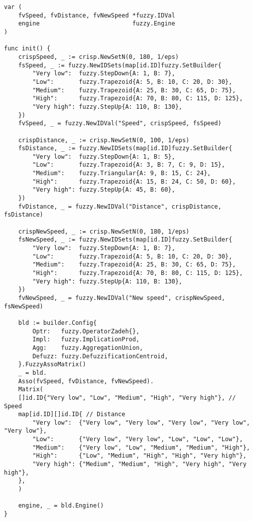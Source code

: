 \begin{lstlisting}[label=lst:inference,caption=Инициализация нечётких переменных и правил логического вывода]
var (
	fvSpeed, fvDistance, fvNewSpeed *fuzzy.IDVal
	engine                          fuzzy.Engine
)

func init() {
	crispSpeed, _ := crisp.NewSetN(0, 180, 1/eps)
	fsSpeed, _ := fuzzy.NewIDSets(map[id.ID]fuzzy.SetBuilder{
		"Very low":  fuzzy.StepDown{A: 1, B: 7},
		"Low":       fuzzy.Trapezoid{A: 5, B: 10, C: 20, D: 30},
		"Medium":    fuzzy.Trapezoid{A: 25, B: 30, C: 65, D: 75},
		"High":      fuzzy.Trapezoid{A: 70, B: 80, C: 115, D: 125},
		"Very high": fuzzy.StepUp{A: 110, B: 130},
	})
	fvSpeed, _ = fuzzy.NewIDVal("Speed", crispSpeed, fsSpeed)
	
	crispDistance, _ := crisp.NewSetN(0, 100, 1/eps)
	fsDistance, _ := fuzzy.NewIDSets(map[id.ID]fuzzy.SetBuilder{
		"Very low":  fuzzy.StepDown{A: 1, B: 5},
		"Low":       fuzzy.Trapezoid{A: 3, B: 7, C: 9, D: 15},
		"Medium":    fuzzy.Triangular{A: 9, B: 15, C: 24},
		"High":      fuzzy.Trapezoid{A: 15, B: 24, C: 50, D: 60},
		"Very high": fuzzy.StepUp{A: 45, B: 60},
	})
	fvDistance, _ = fuzzy.NewIDVal("Distance", crispDistance, fsDistance)
	
	crispNewSpeed, _ := crisp.NewSetN(0, 180, 1/eps)
	fsNewSpeed, _ := fuzzy.NewIDSets(map[id.ID]fuzzy.SetBuilder{
		"Very low":  fuzzy.StepDown{A: 1, B: 7},
		"Low":       fuzzy.Trapezoid{A: 5, B: 10, C: 20, D: 30},
		"Medium":    fuzzy.Trapezoid{A: 25, B: 30, C: 65, D: 75},
		"High":      fuzzy.Trapezoid{A: 70, B: 80, C: 115, D: 125},
		"Very high": fuzzy.StepUp{A: 110, B: 130},
	})
	fvNewSpeed, _ = fuzzy.NewIDVal("New speed", crispNewSpeed, fsNewSpeed)
	
	bld := builder.Config{
		Optr:   fuzzy.OperatorZadeh{},
		Impl:   fuzzy.ImplicationProd,
		Agg:    fuzzy.AggregationUnion,
		Defuzz: fuzzy.DefuzzificationCentroid,
	}.FuzzyAssoMatrix()
	_ = bld.
	Asso(fvSpeed, fvDistance, fvNewSpeed).
	Matrix(
	[]id.ID{"Very low", "Low", "Medium", "High", "Very high"}, // Speed
	map[id.ID][]id.ID{ // Distance
		"Very low":  {"Very low", "Very low", "Very low", "Very low", "Very low"},
		"Low":       {"Very low", "Very low", "Low", "Low", "Low"},
		"Medium":    {"Very low", "Low", "Medium", "Medium", "High"},
		"High":      {"Low", "Medium", "High", "High", "Very high"},
		"Very high": {"Medium", "Medium", "High", "Very high", "Very high"},
	},
	)
	
	engine, _ = bld.Engine()
}
\end{lstlisting}


